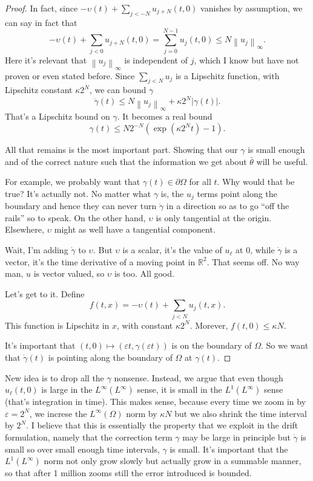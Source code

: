 \documentclass[11pt]{amsart}
\theoremstyle{remark}
\newcommand{\R}{\mathbb{R}}
\newcommand{\eps}{\varepsilon}
\newcommand{\norm}[1]{\left\lVert#1\right\rVert}
\newcommand{\del}{\partial}
\begin{document}
\begin{proof}
In fact, since $-\upsilon(t) + \sum_{j<-N} u_{j+N}(t,0)$ vanishes by assumption, we can say in fact that 
\[ -\upsilon(t) +  \sum_{j<0} u_{j+N}(t, 0) = \sum_{j=0}^{N-1} u_j(t,0) \leq N \norm{u_j}_\infty. \]
Here it's relevant that $\norm{u_j}_\infty$ is independent of $j$, which I know but have not proven or even stated before.  Since $\sum_{j<N} u_j$ is a Lipschitz function, with Lipschitz constant $\kappa 2^N$, we can bound $\gamma$
\[ \dot{\gamma}(t) \leq N \norm{u_j}_\infty + \kappa 2^N |\gamma(t)|. \]
That's a Lipschitz bound on $\gamma$.  It becomes a real bound
\[ \gamma(t) \leq N 2^{-N} (\exp(\kappa 2^N t)-1). \]

All that remains is the most important part.  Showing that our $\gamma$ is small enough and of the correct nature such that the information we get about $\bar{\theta}$ will be useful.  

For example, we probably want that $\gamma(t) \in \del \Omega$ for all $t$.  Why would that be true?  It's actually not.  No matter what $\gamma$ is, the $u_j$ terms point along the boundary and hence they can never turn $\dot{\gamma}$ in a direction so as to go ``off the rails'' so to speak.  On the other hand, $\upsilon$ is only tangential at the origin.  Elsewhere, $\upsilon$ might as well have a tangential component.  

Wait, I'm adding $\dot{\gamma}$ to $\upsilon$.  But $\upsilon$ is a scalar, it's the value of $u_\ell$ at 0, while $\dot{\gamma}$ is a vector, it's the time derivative of a moving point in $\R^2$.  That seems off.  No way man, $u$ is vector valued, so $\upsilon$ is too.  All good.  

Let's get to it.  Define
\[ f(t,x) = -\upsilon(t) + \sum_{j < N} u_j(t,x). \]
This function is Lipschitz in $x$, with constant $\kappa 2^N$.  Morever, $f(t,0) \leq \kappa N$.  

It's important that $(t,0) \mapsto (\eps t, \gamma(\eps t))$ is on the boundary of $\Omega$.  So we want that $\dot{\gamma}(t)$ is pointing along the boundary of $\Omega$ at $\gamma(t)$.  


\end{proof}

New idea is to drop all the $\gamma$ nonsense.  Instead, we argue that even though $u_\ell(t,0)$ is large in the $L^\infty(L^\infty)$ sense, it is small in the $L^1(L^\infty)$ sense (that's integration in time).  This makes sense, because every time we zoom in by $\eps = 2^N$, we increse the $L^\infty(\Omega)$ norm by $\kappa N$ but we also shrink the time interval by $2^N$.  I believe that this is essentially the property that we exploit in the drift formulation, namely that the correction term $\gamma$ may be large in principle but $\dot{\gamma}$ is small so over small enough time intervals, $\gamma$ is small.  It's important that the $L^1(L^\infty)$ norm not only grow slowly but actually grow in a summable manner, so that after 1 million zooms still the error introduced is bounded.  
\end{document}
